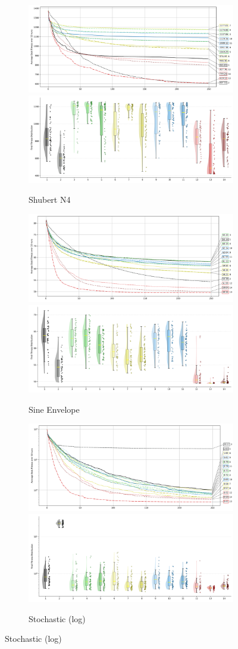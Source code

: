 \begin{figure}[p]
\begin{subfigure}{1\textwidth}
    \centering
    \includegraphics[width=.49\textwidth]{Figures/results/100/Shubert_N4_All_selected_algorithms_dim100_annot_legend.png}
    \includegraphics[width=.49\textwidth]{Figures/results/100/Shubert_N4_all_dim100_raincloud_vertical.png}
    \caption{Shubert N4}
\end{subfigure}

\begin{subfigure}{1\textwidth}
    \centering
    \includegraphics[width=.49\textwidth]{Figures/results/100/SineEnvelope_All_selected_algorithms_dim100_annot_legend.png}
    \includegraphics[width=.49\textwidth]{Figures/results/100/SineEnvelope_all_dim100_raincloud_vertical.png}
    \caption{Sine Envelope}
\end{subfigure}

\begin{subfigure}{1\textwidth}
    \centering
    \includegraphics[width=.49\textwidth]{Figures/results/100/Stochastic_All_selected_algorithms_dim100_annot_legend.png}
    \includegraphics[width=.49\textwidth]{Figures/results/100/Stochastic_all_dim100_raincloud_vertical.png}
    \caption{Stochastic (log)}
\end{subfigure}


\end{figure}
